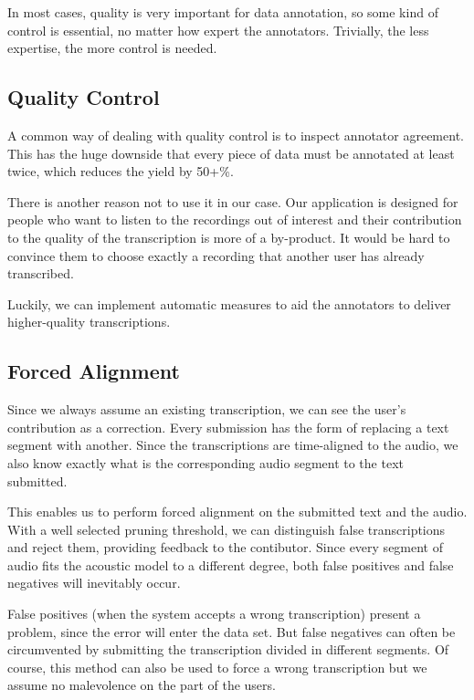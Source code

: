 \documentclass{itatnew}
\begin{document}
In most cases, quality is very important for data annotation, so some kind of
control is essential, no matter how expert the annotators. Trivially, the less
expertise, the more control is needed.

\subsection{Quality Control}

A common way of dealing with quality control is to inspect annotator agreement.
This has the huge downside that every piece of data must be annotated at least
twice, which reduces the yield by 50+\%.

There is another reason not to use it in our case. Our application is
designed for people who want to listen to the recordings out of interest and
their contribution to the quality of the transcription is more of a by-product.
It would be hard to convince them to choose exactly a recording that another
user has already transcribed.

Luckily, we can implement automatic measures to aid the annotators to deliver
higher-quality transcriptions.

\subsection{Forced Alignment}

Since we always assume an existing transcription, we can see the user's
contribution as a correction. Every submission has
the form of replacing a text segment with another. Since the transcriptions are
time-aligned to the audio, we also know exactly what is the corresponding audio
segment to the text submitted.

This enables us to perform forced alignment on the submitted text and the audio.
With a well selected pruning threshold, we can distinguish false transcriptions
and reject them, providing feedback to the contibutor.
Since every segment of audio fits the acoustic model to a different degree, both
false positives and false negatives will inevitably occur.

False positives (when the system accepts a wrong transcription) present a
problem, since the error will enter the data set. But false negatives can often
be circumvented by submitting the transcription divided in different segments.
Of course, this method can also be used to force a wrong transcription but we
assume no malevolence on the part of the users.
\end{document}
